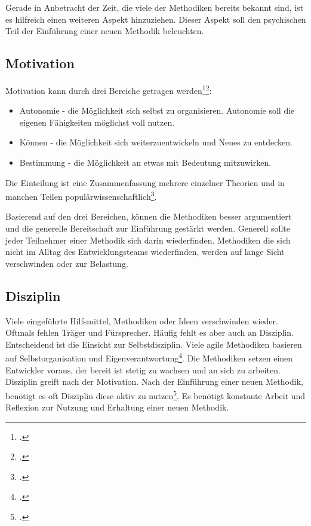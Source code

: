 Gerade in Anbetracht der Zeit, die viele der Methodiken bereits bekannt sind, ist es hilfreich einen weiteren Aspekt hinzuziehen. Dieser Aspekt soll den psychischen Teil der Einführung einer neuen Methodik beleuchten.

\subsection{Motivation}

Motivation kann durch drei Bereiche getragen werden\footcite[vgl.][]{codingame-drive}\footcite[vgl.][Kap. Autonomie ff.]{pink-drive}:
\begin{itemize}
\item Autonomie - die Möglichkeit sich selbst zu organisieren. Autonomie soll die eigenen Fähigkeiten möglichst voll nutzen.
\item Können - die Möglichkeit sich weiterzuentwickeln und Neues zu entdecken.
\item Bestimmung - die Möglichkeit an etwas mit Bedeutung mitzuwirken.
\end{itemize}

Die Einteilung ist eine Zusammenfassung mehrere einzelner Theorien und in manchen Teilen populärwissenschaftlich\footcite[vgl.][]{drive-scholarly-review}. 

Basierend auf den drei Bereichen, können die Methodiken besser argumentiert und die generelle Bereitschaft zur Einführung gestärkt werden. Generell sollte jeder Teilnehmer einer Methodik sich darin wiederfinden. Methodiken die sich nicht im Alltag des Entwicklungsteams wiederfinden, werden auf lange Sicht verschwinden oder zur Belastung.

\subsection{Disziplin}

Viele eingeführte Hilfsmittel, Methodiken oder Ideen verschwinden wieder. Oftmals fehlen Träger und Fürsprecher. Häufig fehlt es aber auch an Disziplin. Entscheidend ist die Einsicht zur Selbstdisziplin. Viele agile Methodiken basieren auf Selbstorganisation und Eigenverantwortung\footcite[vgl.][]{codingame-agile-failed}. Die Methodiken setzen einen Entwickler voraus, der bereit ist stetig zu wachsen und an sich zu arbeiten.
Disziplin greift nach der Motivation. Nach der Einführung einer neuen Methodik, benötigt es oft Disziplin diese aktiv zu nutzen\footcite[vgl.][]{screw-motivation}. Es benötigt konstante Arbeit und Reflexion zur Nutzung und Erhaltung einer neuen Methodik.

